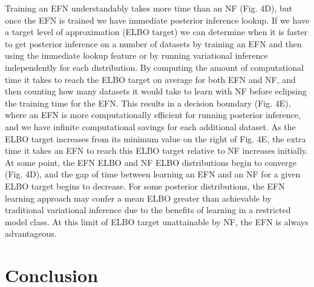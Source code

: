 \documentclass[twoside]{article}
\begin{document}
Training an EFN understandably takes more time than an NF (Fig. 4D), but once the EFN is trained we have immediate posterior inference lookup.  If we have a target level of approximation (ELBO target) we can determine when it is faster to get posterior inference on a number of datasets by training an EFN and then using the immediate lookup feature or by running variational inference independently for each distribution.  By computing the amount of computational time it takes to reach the ELBO target on average for both EFN and NF, and then counting how many datasets it would take to learn with NF before eclipsing the training time for the EFN.  This results in a decision boundary (Fig. 4E), where an EFN is more computationally efficient for running posterior inference, and we have infinite computational savings for each additional dataset.  As the ELBO target increases from its minimum value on the right of Fig. 4E, the extra time it takes an EFN to reach this ELBO target relative to NF increases initially.  At some point, the EFN ELBO and NF ELBO distributions begin to converge (Fig. 4D), and the gap of time between learning an EFN and an NF for a given ELBO target begins to decrease.  For some posterior distributions, the EFN learning approach may confer a mean ELBO greater than achievable by traditional variational inference due to the benefits of learning in a restricted model class.  At this limit of ELBO target unattainable by NF, the EFN is always advantageous.

\section{Conclusion}
\end{document}
